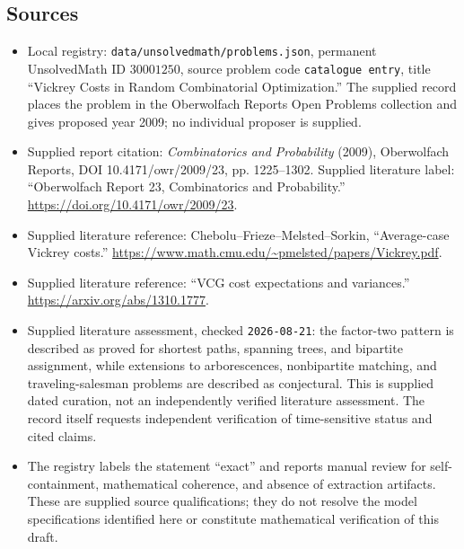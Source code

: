 \documentclass[11pt]{article}
\begin{document}
\subsection{Sources}
\begin{itemize}
\item Local registry: \texttt{data/unsolvedmath/problems.json}, permanent UnsolvedMath ID \(30001250\), source problem code \texttt{catalogue entry}, title ``Vickrey Costs in Random Combinatorial Optimization.'' The supplied record places the problem in the Oberwolfach Reports Open Problems collection and gives proposed year 2009; no individual proposer is supplied.
\item Supplied report citation: \emph{Combinatorics and Probability} (2009), Oberwolfach Reports, DOI 10.4171/owr/2009/23, pp. 1225--1302. Supplied literature label: ``Oberwolfach Report 23, Combinatorics and Probability.'' \url{https://doi.org/10.4171/owr/2009/23}.
\item Supplied literature reference: Chebolu--Frieze--Melsted--Sorkin, ``Average-case Vickrey costs.'' \url{https://www.math.cmu.edu/~pmelsted/papers/Vickrey.pdf}.
\item Supplied literature reference: ``VCG cost expectations and variances.'' \url{https://arxiv.org/abs/1310.1777}.
\item Supplied literature assessment, checked \texttt{2026-08-21}: the factor-two pattern is described as proved for shortest paths, spanning trees, and bipartite assignment, while extensions to arborescences, nonbipartite matching, and traveling-salesman problems are described as conjectural. This is supplied dated curation, not an independently verified literature assessment. The record itself requests independent verification of time-sensitive status and cited claims.
\item The registry labels the statement ``exact'' and reports manual review for self-containment, mathematical coherence, and absence of extraction artifacts. These are supplied source qualifications; they do not resolve the model specifications identified here or constitute mathematical verification of this draft.
\end{itemize}
\end{document}
